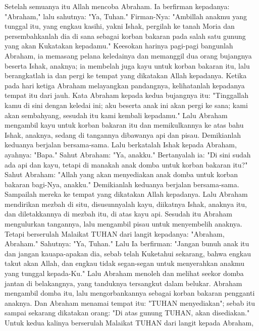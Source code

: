 \begin{biblechapter} %
 Setelah semuanya itu Allah mencoba Abraham. Ia berfirman kepadanya: "Abraham," lalu sahutnya: "Ya, Tuhan."
\verse Firman-Nya: "Ambillah anakmu yang tunggal itu, yang engkau kasihi, yakni Ishak, pergilah ke tanah Moria dan persembahkanlah dia di sana sebagai korban bakaran pada salah satu gunung yang akan Kukatakan kepadamu."
\verse Keesokan harinya pagi-pagi bangunlah Abraham, ia memasang pelana keledainya dan memanggil dua orang bujangnya beserta Ishak, anaknya; ia membelah juga kayu untuk korban bakaran itu, lalu berangkatlah ia dan pergi ke tempat yang dikatakan Allah kepadanya.
\verse Ketika pada hari ketiga Abraham melayangkan pandangnya, kelihatanlah kepadanya tempat itu dari jauh.
\verse Kata Abraham kepada kedua bujangnya itu: "Tinggallah kamu di sini dengan keledai ini; aku beserta anak ini akan pergi ke sana; kami akan sembahyang, sesudah itu kami kembali kepadamu."
\verse Lalu Abraham mengambil kayu untuk korban bakaran itu dan memikulkannya ke atas bahu Ishak, anaknya, sedang di tangannya dibawanya api dan pisau. Demikianlah keduanya berjalan bersama-sama.
\verse Lalu berkatalah Ishak kepada Abraham, ayahnya: "Bapa." Sahut Abraham: "Ya, anakku." Bertanyalah ia: "Di sini sudah ada api dan kayu, tetapi di manakah anak domba untuk korban bakaran itu?"
\verse Sahut Abraham: "Allah yang akan menyediakan anak domba untuk korban bakaran bagi-Nya, anakku." Demikianlah keduanya berjalan bersama-sama.
\verse Sampailah mereka ke tempat yang dikatakan Allah kepadanya. Lalu Abraham mendirikan mezbah di situ, disusunnyalah kayu, diikatnya Ishak, anaknya itu, dan diletakkannya di mezbah itu, di atas kayu api.
\verse Sesudah itu Abraham mengulurkan tangannya, lalu mengambil pisau untuk menyembelih anaknya.
\verse Tetapi berserulah Malaikat TUHAN dari langit kepadanya: "Abraham, Abraham." Sahutnya: "Ya, Tuhan."
\verse Lalu Ia berfirman: "Jangan bunuh anak itu dan jangan kauapa-apakan dia, sebab telah Kuketahui sekarang, bahwa engkau takut akan Allah, dan engkau tidak segan-segan untuk menyerahkan anakmu yang tunggal kepada-Ku."
\verse Lalu Abraham menoleh dan melihat seekor domba jantan di belakangnya, yang tanduknya tersangkut dalam belukar. Abraham mengambil domba itu, lalu mengorbankannya sebagai korban bakaran pengganti anaknya.
\verse Dan Abraham menamai tempat itu: "TUHAN menyediakan"; sebab itu sampai sekarang dikatakan orang: "Di atas gunung TUHAN, akan disediakan."
\verse Untuk kedua kalinya berserulah Malaikat TUHAN dari langit kepada Abraham,

\end{biblechapter}

